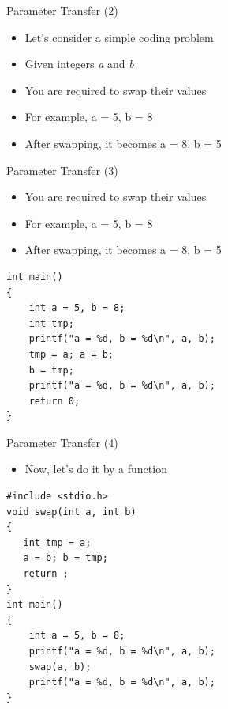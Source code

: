 \begin{frame}[fragile]{Parameter Transfer (2)}
\begin{itemize}
	\item {Let's consider a simple coding problem}
	\item {Given integers \textit{a} and \textit{b}}
	\item {You are required to swap their values}
	\item {For example, a = 5, b = 8}
	\item {After swapping, it becomes a = 8, b = 5}
\end{itemize}

\end{frame}

\begin{frame}[fragile]{Parameter Transfer (3)}
\begin{itemize}
	\item {You are required to swap their values}
	\item {For example, a = 5, b = 8}
	\item {After swapping, it becomes a = 8, b = 5}
\end{itemize}
\begin{lstlisting}
int main()
{
    int a = 5, b = 8;
    int tmp;
    printf("a = %d, b = %d\n", a, b);
    tmp = a; a = b;
    b = tmp;
    printf("a = %d, b = %d\n", a, b);
    return 0;
}
\end{lstlisting}

\end{frame}

\begin{frame}[fragile]{Parameter Transfer (4)}
\begin{itemize}
	\item {Now, let's do it by a function}
\end{itemize}
\begin{lstlisting}
#include <stdio.h>
void swap(int a, int b)
{
   int tmp = a;
   a = b; b = tmp;
   return ;
}
int main()
{
    int a = 5, b = 8;
    printf("a = %d, b = %d\n", a, b);
    swap(a, b);
    printf("a = %d, b = %d\n", a, b);
}
\end{lstlisting}
\end{frame}

